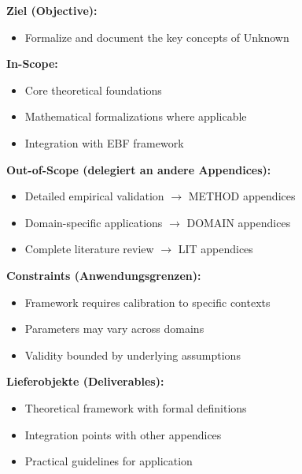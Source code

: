 \begin{tcolorbox}[
    colback=orange!5!white,
    colframe=orange!75!black,
    title={\textbf{Appendix Scope: Ziel / In-Scope / Out-of-Scope / Constraints}},
    fonttitle=\bfseries
]

\textbf{Ziel (Objective):}
\begin{itemize}[nosep]
    \item Formalize and document the key concepts of Unknown
\end{itemize}

\textbf{In-Scope:}
\begin{itemize}[nosep]
    \item Core theoretical foundations
    \item Mathematical formalizations where applicable
    \item Integration with EBF framework
\end{itemize}

\textbf{Out-of-Scope (delegiert an andere Appendices):}
\begin{itemize}[nosep]
    \item Detailed empirical validation $\rightarrow$ METHOD appendices
    \item Domain-specific applications $\rightarrow$ DOMAIN appendices
    \item Complete literature review $\rightarrow$ LIT appendices
\end{itemize}

\textbf{Constraints (Anwendungsgrenzen):}
\begin{itemize}[nosep]
    \item Framework requires calibration to specific contexts
    \item Parameters may vary across domains
    \item Validity bounded by underlying assumptions
\end{itemize}

\textbf{Lieferobjekte (Deliverables):}
\begin{itemize}[nosep]
    \item Theoretical framework with formal definitions
    \item Integration points with other appendices
    \item Practical guidelines for application
\end{itemize}

\end{tcolorbox}



